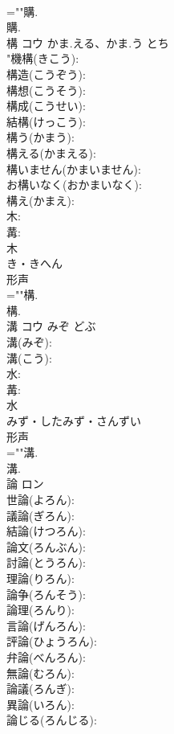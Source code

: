 \documentclass[8pt]{extreport}
\begin{document}
\begin{CJK}{UTF8}{min}
\\	=""購.
\\	購.
\\	構	コウ	かま.える、かま.う	とち	
\\	"機構(きこう): 
\\	構造(こうぞう): 
\\	構想(こうそう): 
\\	構成(こうせい): 
\\	結構(けっこう): 
\\	構う(かまう): 
\\	構える(かまえる): 
\\	構いません(かまいません): 
\\	お構いなく(おかまいなく): 
\\	構え(かまえ): 
\\	木: 
\\	冓: 
\\	木	
\\	き・きへん	
\\	形声 
\\	=""構.
\\	構.
\\	溝	コウ	みぞ	どぶ	
\\	溝(みぞ): 
\\	溝(こう): 
\\	水: 
\\	冓: 
\\	水	
\\	みず・したみず・さんずい	
\\	形声 
\\	=""溝.
\\	溝.
\\	論	ロン			
\\	世論(よろん): 
\\	議論(ぎろん): 
\\	結論(けつろん): 
\\	論文(ろんぶん): 
\\	討論(とうろん): 
\\	理論(りろん): 
\\	論争(ろんそう): 
\\	論理(ろんり): 
\\	言論(げんろん): 
\\	評論(ひょうろん): 
\\	弁論(べんろん): 
\\	無論(むろん): 
\\	論議(ろんぎ): 
\\	異論(いろん): 
\\	論じる(ろんじる): 

\end{CJK}
\end{document}
